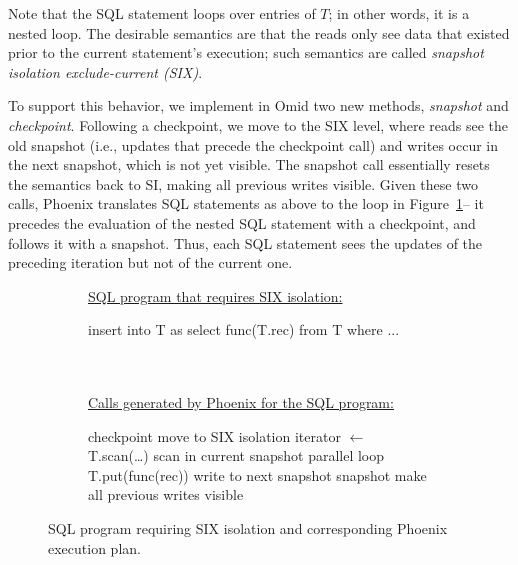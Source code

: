 Note that the SQL statement loops over entries of $T$; in other words, it is a nested loop. 
The desirable semantics are that the reads only see  data that existed prior to the 
current statement's execution; such semantics are called 
\emph{snapshot isolation exclude-current (SIX)}.

To support this behavior, we implement in Omid two new methods, {\em snapshot\/} and {\em checkpoint}.
Following a checkpoint, we move to the SIX level, where reads see the old snapshot (i.e., updates that
precede the checkpoint call) and writes occur in the next snapshot, which is not yet visible.
The snapshot call essentially resets the semantics back to SI, making all previous writes visible.
Given these two calls, Phoenix translates SQL statements as above to the loop in Figure~\ref{alg:six}-- 
it precedes the evaluation of the nested SQL statement with a checkpoint, and follows it with a snapshot.
Thus, each SQL statement sees the updates of the preceding iteration but not of the current one. 

\begin{figure}
\begin{subfigure}[tb]{\columnwidth}
\underline{\hspace{\columnwidth}}
\underline{\small SQL program that requires SIX isolation:}
\begin{algorithmic}
\State insert into T as select func(T.rec) from T  where ... 
\EndFor
\end{algorithmic}
\end{subfigure}
\begin{subfigure}[tb]{\columnwidth}
\ \\ \\
\underline{\small Calls generated by Phoenix for the SQL program:}
\begin{algorithmic}
\State checkpoint \Comment move to SIX isolation
\State iterator $\leftarrow$ T.scan(\dots) \Comment scan in current snapshot
 \Comment parallel loop
    \State T.put(func(rec)) \Comment write to next snapshot              
\EndFor
\State snapshot  \Comment make all previous writes visible
\EndFor
\end{algorithmic}
\underline{\hspace{\columnwidth}}
\end{subfigure}
\caption{  SQL program requiring SIX isolation and corresponding Phoenix execution plan.}
\label{alg:six}
\end{figure}

